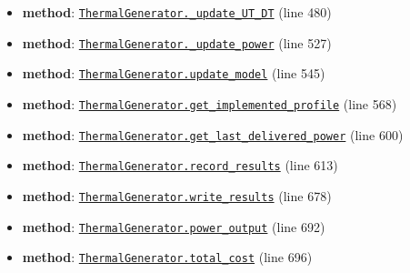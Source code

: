 \documentclass[11pt]{report}
\begin{document}
\begin{itemize}[leftmargin=*]
  \item \textbf{method}: \hyperref[def:examples-thermal_generator.py:ThermalGenerator._update_UT_DT:L480]{\texttt{ThermalGenerator.\_update\_UT\_DT}} (line 480)
  \item \textbf{method}: \hyperref[def:examples-thermal_generator.py:ThermalGenerator._update_power:L527]{\texttt{ThermalGenerator.\_update\_power}} (line 527)
  \item \textbf{method}: \hyperref[def:examples-thermal_generator.py:ThermalGenerator.update_model:L545]{\texttt{ThermalGenerator.update\_model}} (line 545)
  \item \textbf{method}: \hyperref[def:examples-thermal_generator.py:ThermalGenerator.get_implemented_profile:L568]{\texttt{ThermalGenerator.get\_implemented\_profile}} (line 568)
  \item \textbf{method}: \hyperref[def:examples-thermal_generator.py:ThermalGenerator.get_last_delivered_power:L600]{\texttt{ThermalGenerator.get\_last\_delivered\_power}} (line 600)
  \item \textbf{method}: \hyperref[def:examples-thermal_generator.py:ThermalGenerator.record_results:L613]{\texttt{ThermalGenerator.record\_results}} (line 613)
  \item \textbf{method}: \hyperref[def:examples-thermal_generator.py:ThermalGenerator.write_results:L678]{\texttt{ThermalGenerator.write\_results}} (line 678)
  \item \textbf{method}: \hyperref[def:examples-thermal_generator.py:ThermalGenerator.power_output:L692]{\texttt{ThermalGenerator.power\_output}} (line 692)
  \item \textbf{method}: \hyperref[def:examples-thermal_generator.py:ThermalGenerator.total_cost:L696]{\texttt{ThermalGenerator.total\_cost}} (line 696)
\end{itemize}
\end{document}
